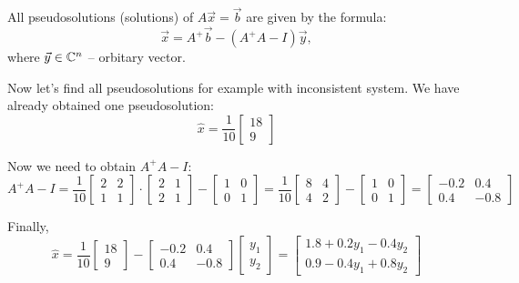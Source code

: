 \begin{proposition}{}{}
    All pseudosolutions (solutions) of $A\vec{x} = \vec{b}$ are given by the formula:
    \[
        \vec{x} = A^+\vec{b} - (A^+A-I)\vec{y},  
    \]
    where $\vec{y} \in \mathbb{C}^n$ -- orbitary vector.
\end{proposition}

Now let's find all pseudosolutions for example with inconsistent system. We have already obtained one pseudosolution:
\[
    \hat{x} = \dfrac{1}{10}\begin{bmatrix}
        18\\
        9
    \end{bmatrix}  
\]

Now we need to obtain $A^+A-I$:
\[
    A^+A-I = \dfrac{1}{10} \begin{bmatrix}
        2 & 2 \\
        1 & 1
    \end{bmatrix} \cdot \begin{bmatrix}
        2 & 1\\
        2 & 1
    \end{bmatrix} - \begin{bmatrix}
        1 & 0\\
        0 & 1
    \end{bmatrix} = \dfrac{1}{10}\begin{bmatrix}
        8 & 4 \\
        4 & 2
    \end{bmatrix} - \begin{bmatrix}
        1 & 0 \\
        0 & 1
    \end{bmatrix} = \begin{bmatrix}
        -0.2 & 0.4 \\
        0.4 & -0.8
    \end{bmatrix}
\]

Finally,
\[
    \hat{x} = \dfrac{1}{10}\begin{bmatrix}
        18 \\ 9
    \end{bmatrix} - \begin{bmatrix}
        -0.2 & 0.4\\
        0.4 & -0.8
    \end{bmatrix}  \begin{bmatrix}
        y_1 \\
        y_2
    \end{bmatrix} = \begin{bmatrix}
        1.8 + 0.2y_1 - 0.4 y_2\\
        0.9 - 0.4y_1 + 0.8y_2
    \end{bmatrix} 
\]
